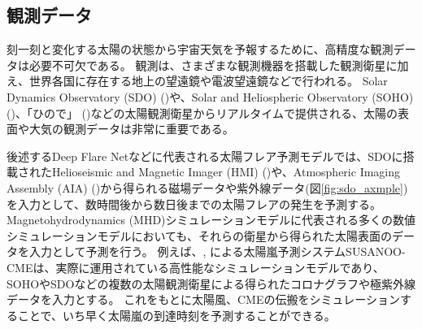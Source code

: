   \subsection{観測データ}
  刻一刻と変化する太陽の状態から宇宙天気を予報するために、高精度な観測データは必要不可欠である。
  観測は、さまざまな観測機器を搭載した観測衛星に加え、世界各国に存在する地上の望遠鏡や電波望遠鏡などで行われる。
  Solar Dynamics Observatory (SDO) ()や、Solar and Heliospheric Observatory (SOHO) ()、「ひので」 ()などの太陽観測衛星からリアルタイムで提供される、太陽の表面や大気の観測データは非常に重要である。

  後述するDeep Flare Netなどに代表される太陽フレア予測モデルでは、SDOに搭載されたHelioseismic and Magnetic Imager (HMI) ()や、Atmospheric Imaging Assembly (AIA) ()から得られる磁場データや紫外線データ(図\ref{fig:sdo_axmple})を入力として、数時間後から数日後までの太陽フレアの発生を予測する。
  Magnetohydrodynamics (MHD)シミュレーションモデルに代表される多くの数値シミュレーションモデルにおいても、それらの衛星から得られた太陽表面のデータを入力として予測を行う。
  例えば、, による太陽嵐予測システムSUSANOO-CMEは、実際に運用されている高性能なシミュレーションモデルであり、SOHOやSDOなどの複数の太陽観測衛星による得られたコロナグラフや極紫外線データを入力とする。
  これをもとに太陽風、CMEの伝搬をシミュレーションすることで、いち早く太陽嵐の到達時刻を予測することができる。
